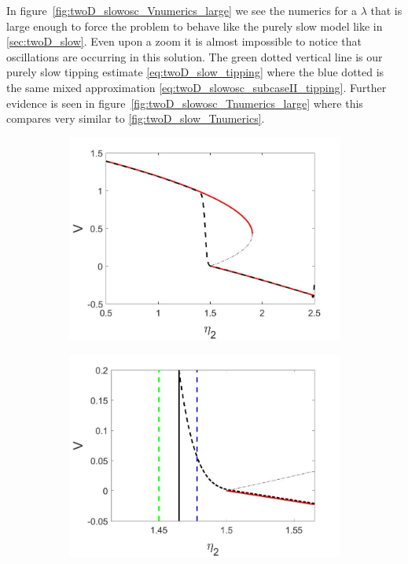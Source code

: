 In figure~\ref{fig:twoD_slowosc_Vnumerics_large} we see the numerics for a $\lambda$ that is large enough to force the problem to behave like the purely slow model like in \autoref{sec:twoD_slow}. Even upon a zoom it is almost impossible to notice that oscillations are occurring in this solution. The green dotted vertical line is our purely slow tipping estimate \eqref{eq:twoD_slow_tipping} where the blue dotted is the same mixed approximation \eqref{eq:twoD_slowosc_subcaseII_tipping}. Further evidence is seen in figure~\ref{fig:twoD_slowosc_Tnumerics_large} where this compares very similar to \eqref{fig:twoD_slow_Tnumerics}.

\begin{figure}[H]
\centering
\begin{subfigure}{.5\textwidth}
  \centering
  \includegraphics[width=\linewidth]{twoD/slowosc_bif_diagram_large.jpg}
  \caption{}
\end{subfigure}%
\begin{subfigure}{.5\textwidth}
  \centering
  \includegraphics[width=\linewidth]{twoD/slowosc_bif_diagram_large_zoom.jpg}

\end{subfigure}
\end{figure}
